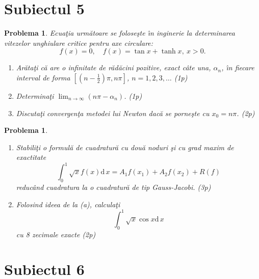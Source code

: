 \documentclass[12pt]{article}%
\newtheorem{problem}[theorem]{Problema}
\begin{document}
\section*{Subiectul 5}

\begin{problem}
\label{Gautschip4.31}Ecua\c{t}ia urm\u{a}toare se folose\c{s}te \^{\i}n
inginerie la determinarea vitezelor unghiulare critice pentru axe circulare:%
\[
f(x)=0,\quad f(x)=\tan x+\tanh x,~x>0.
\]


\begin{enumerate}
\item[(a)] Ar\u{a}ta\c{t}i c\u{a} are o infinitate de r\u{a}d\u{a}cini
pozitive, exact c\^{a}te una, $\alpha_{n}$, \^{\i}n fiecare interval de forma
$\left[  \left(  n-\frac{1}{2}\right)  \pi,n\pi\right]  $, $n=1,2,3,\dots$ (1p)

\item[(b)] Determina\c{t}i $\lim_{n\rightarrow\infty}\left(  n\pi-\alpha
_{n}\right)  $. (1p)

\item[(c)] Discuta\c{t}i convergen\c{t}a metodei lui Newton dac\u{a} se
porne\c{s}te cu $x_{0}=n\pi$. (2p)
\end{enumerate}
\end{problem}

\begin{problem}


\begin{enumerate}
\item[(a)] Stabili\c{t}i o formul\u{a} de cuadratur\u{a} cu dou\u{a} noduri
\c{s}i cu grad maxim de exactitate
\[
\int_{0}^{1}\sqrt{x}f(x)\mathrm{d}\,x=A_{1}f(x_{1})+A_{2}f(x_{2})+R(f)
\]
reduc\^{a}nd cuadratura la o cuadratur\u{a} de tip Gauss-Jacobi. (3p)

\item[(b)] Folosind ideea de la (a), calcula\c{t}i
\[
\int_{0}^{1}\sqrt{x}\cos x\mathrm{d}\,x
\]
cu 8 zecimale exacte (2p)
\end{enumerate}
\end{problem}

\newpage

\section*{Subiectul 6}
\end{document}

